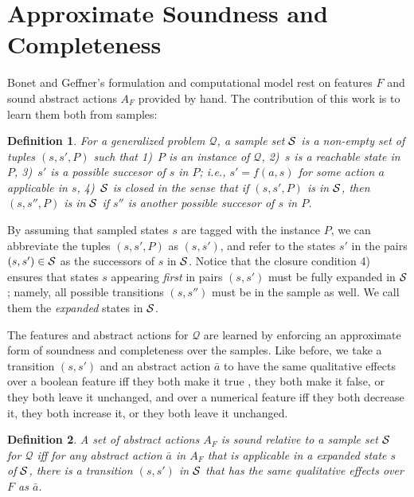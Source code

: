 \documentclass[letterpaper]{article} %
\newtheorem{definition}{Definition}
\newcommand{\Q}{\mathcal{Q}}
\begin{document}
\section{Approximate Soundness and Completeness}


Bonet and Geffner's formulation and computational model rest on 
features $F$ and  sound abstract actions $A_F$ provided by hand.
The contribution of this work is to learn them both from samples:


\begin{definition}
 For a generalized problem $\Q$, a \emph{sample set}  $\cal S$ is a non-empty set of tuples  $(s,s',P)$
 such that 1)~$P$ is an instance of $\Q$, 2)~$s$ is a reachable state in $P$, 3)~$s'$
 is a possible succesor of $s$ in $P$; i.e., $s'=f(a,s)$ for some action $a$ applicable in $s$,
 4)~$\cal S$ is closed in the sense  that if $(s,s',P)$ is in $\cal S$, then $(s,s'',P)$ is in $\cal S$  if $s''$ is another possible succesor of $s$ in $P$.
\end{definition}

By assuming that sampled states $s$ are tagged with the instance $P$, 
we can abbreviate the tuples $(s,s',P)$ as $(s,s')$, and refer to
the states $s'$ in  the pairs $(s,s') \in {\cal S}$ as the successors
of $s$ in ${\cal S}$. Notice that the closure condition 4) ensures that
states $s$ appearing \emph{first} in pairs $(s,s')$ must be fully expanded in ${\cal S}$;
namely, all possible transitions $(s,s'')$ must be in the sample as well. We call them
the \emph{expanded} states in ${\cal S}$.

The features and abstract actions for $\Q$ are  learned by
enforcing an approximate form of soundness and completeness
over the samples. Like before,  we take a transition $(s,s')$ and an abstract action $\bar{a}$
to have  the same qualitative effects over a boolean  feature  iff they both make it true , they both make it false,  or
they both leave it unchanged,  and over a numerical feature  iff they both decrease it,  they both increase it,  or they both leave it unchanged.

\begin{definition}
  A set of abstract actions $A_F$ is sound \emph{relative to a  sample set} $\cal S$ for $\Q$
  iff for  any  abstract action $\bar{a}$ in $A_F$ that is applicable in  a expanded state $s$ of ${\cal S}$,
  there is a transition $(s,s')$ in $\cal S$ that has the same qualitative  effects over $F$ as $\bar{a}$.
\end{definition}
\end{document}
